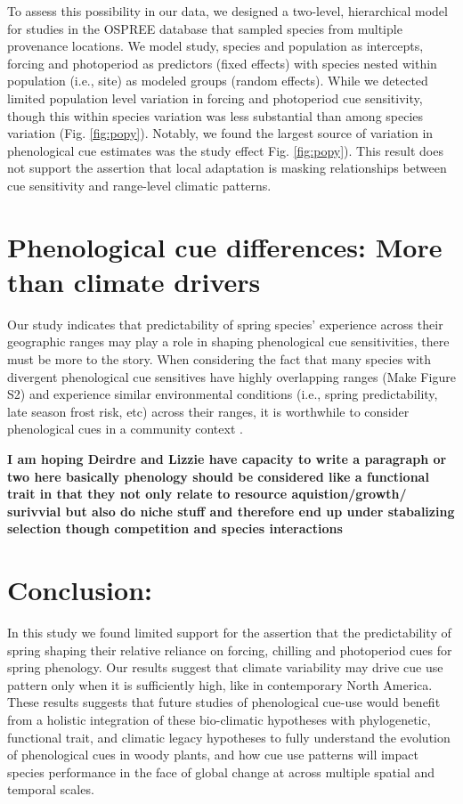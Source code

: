 \documentclass[12pt]{article}
\begin{document}
To assess this possibility in our data, we designed a two-level, hierarchical model for studies in the OSPREE database that sampled species from multiple provenance locations. We model study, species and population as intercepts, forcing and photoperiod as predictors (fixed effects) with species nested within population (i.e., site) as modeled groups (random effects). While we detected limited population level variation in forcing and photoperiod cue sensitivity, though this within species variation was less substantial than among species variation (Fig. \ref{fig:popy}). Notably, we found the largest source of variation in phenological cue estimates was the study effect Fig. \ref{fig:popy}). This result does not support the assertion that local adaptation is masking relationships between cue sensitivity and range-level climatic patterns.

\section*{Phenological cue differences: More than climate drivers}

Our study indicates that predictability of spring species' experience across their geographic ranges may play a role in shaping phenological cue sensitivities, there must be more to the story. When considering the fact that many species with divergent phenological cue sensitives have highly overlapping ranges (Make Figure S2) and experience similar environmental conditions (i.e., spring predictability, late season frost risk, etc) across their ranges, it is worthwhile to consider phenological cues in a community context \citep{}.

\textbf{I am hoping Deirdre and Lizzie have capacity to write a paragraph or two here basically phenology should be considered like a functional trait in that they not only relate to resource aquistion/growth/ surivvial but also do niche stuff and therefore end up under stabalizing selection though competition and species interactions}



\section{Conclusion:}
In this study we found limited support for the assertion that the predictability of spring shaping their relative reliance on forcing, chilling and photoperiod cues for spring phenology. Our results suggest that climate variability may drive cue use pattern only when it is sufficiently high, like in contemporary North America. These results suggests that future studies of phenological cue-use would benefit from a holistic integration of these bio-climatic hypotheses with phylogenetic, functional trait, and climatic legacy hypotheses to fully understand the evolution of phenological cues in woody plants, and how cue use patterns will impact species performance in the face of global change at across multiple spatial and temporal scales.
\end{document}
